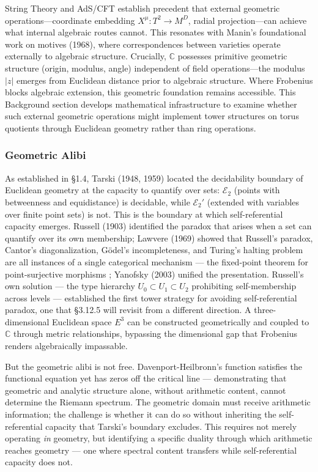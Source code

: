 String Theory and AdS/CFT \cite{Maldacena1998} establish precedent that external geometric operations—coordinate embedding $X^\mu: T^2 \to M^D$, radial projection—can achieve what internal algebraic routes cannot. This resonates with Manin's foundational work on motives (1968), where correspondences between varieties operate externally to algebraic structure. Crucially, $\mathbb{C}$ possesses primitive geometric structure (origin, modulus, angle) independent of field operations—the modulus $|z|$ emerges from Euclidean distance prior to algebraic structure. Where Frobenius blocks algebraic extension, this geometric foundation remains accessible. This Background section develops mathematical infrastructure to examine whether such external geometric operations might implement tower structures on torus quotients through Euclidean geometry rather than ring operations.

\subsubsection{Geometric Alibi}

As established in \S 1.4, Tarski (1948, 1959) located the decidability boundary of Euclidean geometry at the capacity to quantify over sets: $\mathcal{E}_2$ (points with betweenness and equidistance) is decidable, while $\mathcal{E}_2'$ (extended with variables over finite point sets) is not. This is the boundary at which self-referential capacity emerges. Russell (1903) identified the paradox that arises when a set can quantify over its own membership; Lawvere (1969) showed that Russell's paradox, Cantor's diagonalization, Gödel's incompleteness, and Turing's halting problem are all instances of a single categorical mechanism — the fixed-point theorem for point-surjective morphisms \cite{Lawvere1969, Yanofsky2003}; Yanofsky (2003) unified the presentation. Russell's own solution — the type hierarchy $U_0 \subset U_1 \subset U_2$ prohibiting self-membership across levels — established the first tower strategy for avoiding self-referential paradox, one that \S 3.12.5 will revisit from a different direction. A three-dimensional Euclidean space $E^3$ can be constructed geometrically and coupled to $\mathbb{C}$ through metric relationships, bypassing the dimensional gap that Frobenius renders algebraically impassable.

But the geometric alibi is not free. Davenport-Heilbronn's function satisfies the functional equation yet has zeros off the critical line — demonstrating that geometric and analytic structure alone, without arithmetic content, cannot determine the Riemann spectrum. The geometric domain must receive arithmetic information; the challenge is whether it can do so without inheriting the self-referential capacity that Tarski's boundary excludes. This requires not merely operating \textit{in} geometry, but identifying a specific duality through which arithmetic reaches geometry — one where spectral content transfers while self-referential capacity does not.

